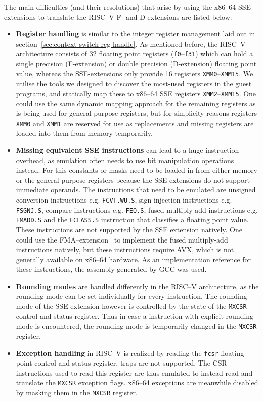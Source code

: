 The main difficulties (and their resolutions) that arise by using the x86--64 SSE extensions to translate the RISC--V F- and D-extensions are listed below:
\begin{itemize}
    \item \textbf{Register handling} is similar to the integer register management laid out in section~\ref{sec:context-switch-reg-handle}.
            As mentioned before, the RISC--V architecture consists of 32 floating point registers (\texttt{f0}--\texttt{f31}) which can hold a single precision (F-extension) or double precision (D-extension) floating point value, whereas the SSE-extensions only provide 16 registers \texttt{XMM0}--\texttt{XMM15}.
            We utilise the tools we designed to discover the most-used registers in the guest programs, and statically map these to x86--64 SSE registers \texttt{XMM2}--\texttt{XMM15}.
            One could use the same dynamic mapping approach for the remaining registers as is being used for general purpose registers, but for simplicity reasons registers \texttt{XMM0} and \texttt{XMM1} are reserved for use as replacements and missing registers are loaded into them from memory temporarily.
    \item \textbf{Missing equivalent SSE instructions} can lead to a huge instruction overhead, as emulation often needs to use bit manipulation operations instead.
            For this constants or masks need to be loaded in from either memory or the general purpose registers because the SSE extensions do not support immediate operands.
            The instructions that need to be emulated are unsigned conversion instructions e.g. \texttt{FCVT.WU.S}, sign-injection instructions e.g. \texttt{FSGNJ.S}, compare instructions e.g. \texttt{FEQ.S}, fused multiply-add instructions e.g. \texttt{FMADD.S} and the \texttt{FCLASS.S} instruction that classifies a floating point value.
            These instructions are not supported by the SSE extension natively.
			One could use the FMA--extension~\cite[S. 141]{intel2017man} to implement the fused multiply-add instructions natively, but these instructions require AVX, which is not generally available on x86--64 hardware.
            As an implementation reference for these instructions, the assembly generated by GCC was used.
    \item \textbf{Rounding modes} are handled differently in the RISC--V architecture, as the rounding mode can be set individually for every instruction.
            The rounding mode of the SSE extension however is controlled by the state of the \texttt{MXCSR} control and status register.
            Thus in case a instruction with explicit rounding mode is encountered, the rounding mode is temporarily changed in the \texttt{MXCSR} register.
    \item \textbf{Exception handling} in RISC--V is realized by reading the \texttt{fcsr} floating-point control and status register, traps are not supported.
            The CSR instructions used to read this register are thus emulated to instead read and translate the \texttt{MXCSR} exception flags.
            x86--64 exceptions are meanwhile disabled by masking them in the \texttt{MXCSR} register.
\end{itemize}


